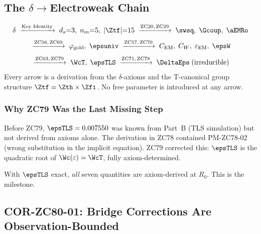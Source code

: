 \documentclass[12pt, a4paper]{article}
\renewcommand{\epsEM}{\varepsilon_{\rm EM}}
\begin{document}
\subsection{The $\delta\to$Electroweak Chain}
\label{sec:chain}

\begin{keybox}[title={From $\delta$ to All Seven: Complete Axiom Chain}]
\[
  \delta
  \;\xrightarrow{\text{Key Identity}}\;
  d_s{=}3,\; n_m{=}5,\; |\Ztf|{=}15
  \;\xrightarrow{\text{ZC20,\,ZC29}}\;
  \swsq,\; \Gcoup,\; \aEMRo
\]
\[
  \;\xrightarrow{\text{ZC56,\,ZC69}}\;
  \varphi_{\rm gold},\; \epsuniv
  \;\xrightarrow{\text{ZC57,\,ZC70}}\;
  C_{\rm EM},\; C_W,\; \epsEM,\; \epsW
\]
\[
  \;\xrightarrow{\text{ZC63,\,ZC79}}\;
  \WcT,\; \epsTLS
  \;\xrightarrow{\text{ZC71,\,ZC78}}\;
  \DeltaEps \;\text{(irreducible)}
\]
Every arrow is a derivation from the $\delta$-axioms and
the T-canonical group structure $\Ztf = \Zth\times\Zfi$.
No free parameter is introduced at any arrow.
\end{keybox}

\subsubsection{Why ZC79 Was the Last Missing Step}

Before ZC79, $\epsTLS = 0.007550$ was known from Part~B
(TLS simulation) but not derived from axioms alone.
The derivation in ZC78 contained PM-ZC78-02 (wrong
substitution in the implicit equation).
ZC79 corrected this: $\epsTLS$ is the quadratic root
of $\Wc(\varepsilon) = \WcT$, fully axiom-determined.

With $\epsTLS$ exact, \emph{all} seven quantities are
axiom-derived at $R_0$. This is the milestone.

\subsection{COR-ZC80-01: Bridge Corrections Are Observation-Bounded}
\label{sec:cor01}
\end{document}
